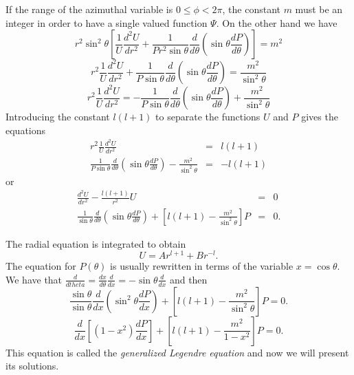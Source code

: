 If the range of the azimuthal variable is $0\leq \phi < 2\pi$, the constant $m$ must be an integer in order to have a single valued function $\Psi$. On the other hand we have 
\begin{equation}
r^2 \sin^2 \theta \left[ \frac{1}{U} \frac{d^2 U}{dr^2} + \frac{1}{P r^2 \sin \theta} \frac{d}{d\theta} \left( \sin \theta \frac{dP}{d\theta} \right)\right] = m^2
\end{equation}
\begin{equation}
r^2 \frac{1}{U} \frac{d^2 U}{dr^2} + \frac{1}{P \sin \theta} \frac{d}{d\theta} \left( \sin \theta \frac{dP}{d\theta} \right) = \frac{m^2}{\sin^2 \theta}
\end{equation}
\begin{equation}
r^2 \frac{1}{U} \frac{d^2 U}{dr^2} = - \frac{1}{P \sin \theta} \frac{d}{d\theta} \left( \sin \theta \frac{dP}{d\theta} \right) + \frac{m^2}{\sin^2 \theta}
\end{equation}
Introducing the constant $l(l+1)$ to separate the functions $U$ and $P$ gives the equations
\begin{eqnarray}
r^2 \frac{1}{U} \frac{d^2 U}{dr^2} &=& l(l+1)  \\
\frac{1}{P \sin \theta} \frac{d}{d\theta} \left( \sin \theta \frac{dP}{d\theta} \right) - \frac{m^2}{\sin^2 \theta} &=& -l(l+1) 
\end{eqnarray}
or 
\begin{eqnarray}
 \frac{d^2 U}{dr^2} - \frac{l(l+1)}{r^2} U &=& 0  \\
\frac{1}{ \sin \theta} \frac{d}{d\theta} \left( \sin \theta \frac{dP}{d\theta} \right) + \left[l(l+1)  - \frac{m^2}{\sin^2 \theta} \right] P &=& 0.
\end{eqnarray}

The radial equation is integrated to obtain
\begin{equation}
U = A r^{l+1} + Br^{-l}.
\end{equation}
The equation for $P(\theta)$ is usually rewritten in terms of the variable $x=\cos \theta$. We have that $\frac{d}{dtheta} = \frac{dx}{d\theta} \frac{d}{dx} = -\sin \theta \frac{d}{dx}$ and then 
\begin{equation}
\frac{\sin \theta}{ \sin \theta} \frac{d}{dx} \left( \sin^2 \theta \frac{dP}{dx} \right) + \left[l(l+1)  - \frac{m^2}{\sin^2 \theta} \right] P = 0.
\end{equation}
\begin{equation}
 \frac{d}{dx} \left[ (1-x^2)  \frac{dP}{dx} \right] + \left[l(l+1)  - \frac{m^2}{1-x^2} \right] P = 0. \label{eq:generalizedLegendreEq}
\end{equation}
This equation is called the \textit{generalized Legendre equation} and now we will present its solutions.

